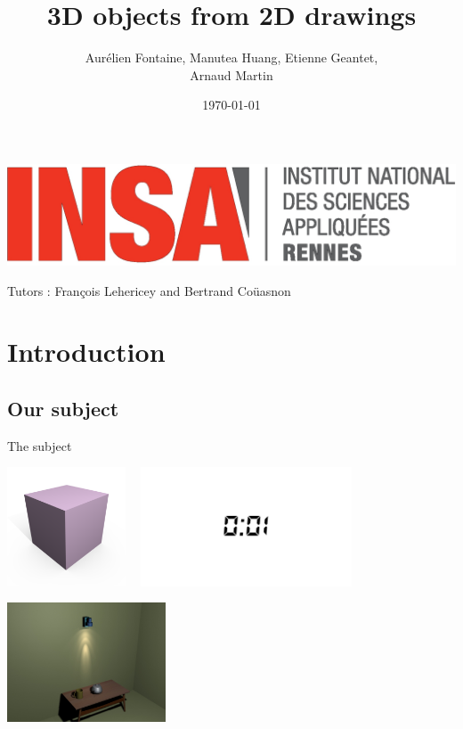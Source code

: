 \documentclass[a4paper,10pt]{beamer}
\title{3D objects from 2D drawings}
\author[Groupe 3INFO]{Aurélien Fontaine, Manutea Huang, Etienne Geantet,\\ Arnaud Martin}
\institute[INSA de Rennes]{Institut National des Sciences Appliquées de Rennes}
\date{\today}
\begin{document}
	\begin{frame}
		\begin{titlepage}
			\centerline{\includegraphics[scale=0.1]{images/logos/logoINSA.jpg}}
			\centerline{Tutors : François Lehericey and Bertrand Coüasnon}	
		\end{titlepage}
	\end{frame}
	
	
	
	\section{Introduction}
	
		\subsection{Our subject}
	
			\begin{frame}{The subject}	
				\centerline{\includegraphics[height=100pt]{images/cube.png}
					\mbox{ }
				\includegraphics[height=100pt]{images/minute.jpg}}
				 
				 
				\centerline{\includegraphics[height=100pt]{images/room.jpg}}              
			\end{frame}
			
\end{document}
